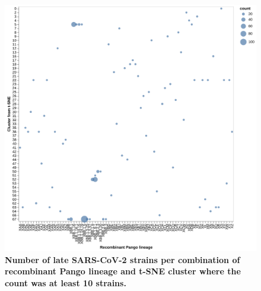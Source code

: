 \begin{figure}[!h]
\includegraphics[width=\columnwidth]{figures/sarscov2-test-tsne-recombinant-counts-Nextstrain_clade.png}
\caption{{\bf Number of late SARS-CoV-2 strains per combination of recombinant Pango lineage and t-SNE cluster where the count was at least 10 strains.}}\label{S_Fig_sarscov2_late_embeddings_tsne_recombinant_counts}
\end{figure}

